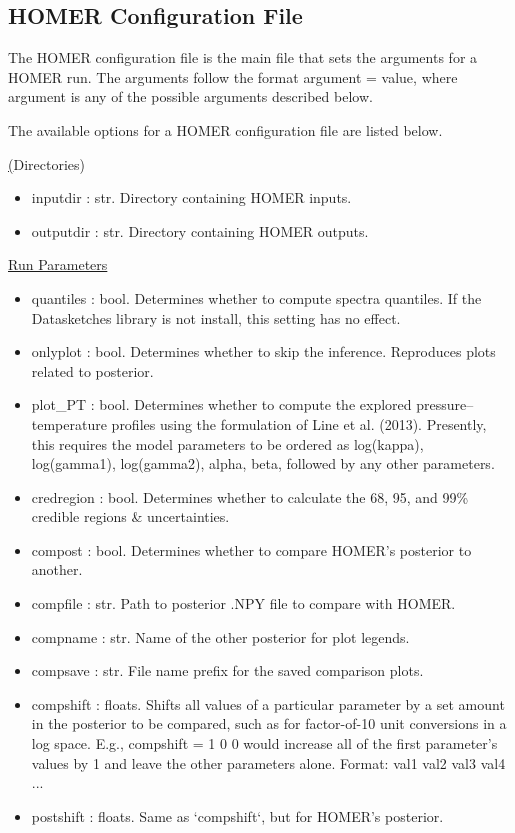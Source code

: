 \documentclass[letterpaper, 12pt]{article}
\begin{document}
\subsection{HOMER Configuration File}
\label{sec:config}
The HOMER configuration file is the main file that sets the arguments for a 
HOMER run. The arguments follow the format {\ttb argument = value}, where 
{\ttb argument} is any of the possible arguments described below. 

\noindent The available options for a HOMER configuration file are listed below.

\noindent \underline(Directories)
\begin{itemize}
\item inputdir   : str.  Directory containing HOMER inputs.
\item outputdir  : str.  Directory containing HOMER outputs.
\end{itemize}

\noindent \underline{Run Parameters}
\begin{itemize}
\item quantiles   : bool. Determines whether to compute spectra quantiles.
                    If the Datasketches library is not install, this setting 
                    has no effect.
\item onlyplot    : bool. Determines whether to skip the inference.
                    Reproduces plots related to posterior.
\item plot\_PT    : bool. Determines whether to compute the explored 
                    pressure--temperature profiles using the formulation of 
                    Line et al. (2013).  Presently, this requires the model 
                    parameters to be ordered as 
                    log(kappa), log(gamma1), log(gamma2), alpha, beta, 
                    followed by any other parameters.
\item credregion  : bool. Determines whether to calculate the 68, 95, and 99\% 
                    credible regions \& uncertainties.
\item compost     : bool. Determines whether to compare HOMER's posterior to 
                          another.
\item compfile    : str.  Path to posterior .NPY file to compare with HOMER.
\item compname    : str.  Name of the other posterior for plot legends.
\item compsave    : str.  File name prefix for the saved comparison plots.
\item compshift   : floats. Shifts all values of a particular parameter by a 
                          set amount in the posterior to be compared, such as 
                          for factor-of-10 unit conversions in a log space.
                    E.g., compshift = 1 0 0 would increase all of the first 
                    parameter's values by 1 and leave the other parameters 
                    alone.
                    Format: val1 val2 val3 val4 ...
\item postshift   : floats. Same as `compshift`, but for HOMER's posterior.
\end{itemize}
\end{document}
